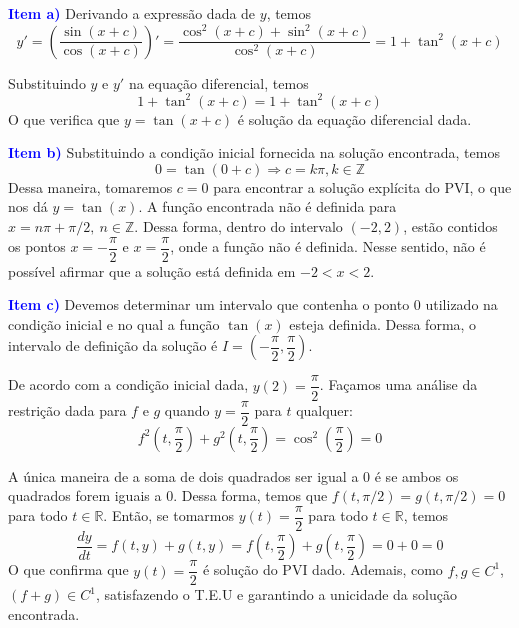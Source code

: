 \documentclass[oneside,12pt,a4paper]{report}
\begin{document}
        \begin{tcolorbox}[enhanced, breakable, colback=blue!1!white,colframe=blue!75!black,title=\textbf{\hyperlink{quest:ex8}{\hypertarget{resp:ex8}{Exercício 8}}}]

        \noindent\textcolor{blue}{\textbf{Item a)}} Derivando a expressão dada de $y$, temos
        \[y' = \left(\frac{\sin(x+c)}{\cos(x+c)}\right)'=\frac{\cos^2(x+c)+\sin^2(x+c)}{\cos^2(x+c)}=1+\tan^2(x+c)\]

        \noindent Substituindo $y$ e $y'$ na equação diferencial, temos
        \[1+\tan^2(x+c) = 1 + \tan^2(x+c)\]
        \noindent O que verifica que $y=\tan(x+c)$ é solução da equação diferencial dada.

        \noindent\textcolor{blue}{\textbf{Item b)}} Substituindo a condição inicial fornecida na solução encontrada, temos
        \[0 = \tan(0+c) \Rightarrow c = k\pi, k\in\mathbb{Z}\]
        \noindent Dessa maneira, tomaremos $c=0$ para encontrar a solução explícita do PVI, o que nos dá $y=\tan(x)$. A função encontrada não é definida para $x=n\pi+\pi/2,~n\in\mathbb{Z}$. Dessa forma, dentro do intervalo $(-2,2)$, estão contidos os pontos $x=-\dfrac{\pi}{2}$ e $x=\dfrac{\pi}{2}$, onde a função não é definida. Nesse sentido, não é possível afirmar que a solução está definida em $-2<x<2$.

        \noindent\textcolor{blue}{\textbf{Item c)}} Devemos determinar um intervalo que contenha o ponto $0$ utilizado na condição inicial e no qual a função $\tan(x)$ esteja definida. Dessa forma, o intervalo de definição da solução é $I=\left(-\dfrac{\pi}{2}, \dfrac{\pi}{2}\right)$.

        \end{tcolorbox}

        \begin{tcolorbox}[enhanced, breakable, colback=blue!1!white,colframe=blue!75!black,title=\textbf{\hyperlink{quest:ex9}{\hypertarget{resp:ex9}{Exercício 9}}}]
        \noindent De acordo com a condição inicial dada, $y(2)=\dfrac{\pi}{2}$. Façamos uma análise da restrição dada para $f$ e $g$ quando $y=\dfrac{\pi}{2}$ para $t$ qualquer:
        \[
        f^2\left(t, \frac{\pi}{2}\right) + g^2\left(t, \frac{\pi}{2}\right) = \cos^2\left(\frac{\pi}{2}\right) = 0 
        \]

        \noindent A única maneira de a soma de dois quadrados ser igual a $0$ é se ambos os quadrados forem iguais a $0$. Dessa forma, temos que $f(t, \pi/2)=g(t, \pi/2)=0$ para todo $t \in \mathbb{R}$. Então, se tomarmos $y(t)=\dfrac{\pi}{2}$ para todo $t \in \mathbb{R}$, temos
        \[\frac{dy}{dt} = f(t, y) + g(t, y) = f\left(t, \frac{\pi}{2}\right) + g\left(t, \frac{\pi}{2}\right) = 0+0 = 0\]
        \noindent O que confirma que $y(t)=\dfrac{\pi}{2}$ é solução do PVI dado. Ademais, como $f, g \in C^1$, $(f+g)\in C^1$, satisfazendo o T.E.U e garantindo a unicidade da solução encontrada.
        \end{tcolorbox}
\end{document}
